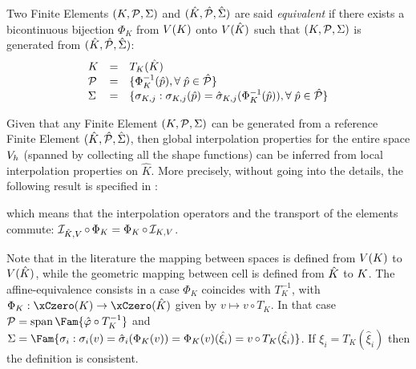 \begin{dfntn}
Two Finite Elements ${({K},{\mathcal P}, {\Sigma})}$ and ${({\hat {{K}}},{\hat {{\mathcal P}}}, {\hat{{\Sigma}}})}$ are said \textit{equivalent} if there exists a bicontinuous bijection $\Phi_K$ from ${V}({K})$ onto ${V}({\hat {{K}}})$ such that ${({K},{\mathcal P}, {\Sigma})}$ is generated from ${({\hat {{K}}},{\hat {{\mathcal P}}}, {\hat{{\Sigma}}})}$:
\begin{equation*}
\begin{array}{lcl}
K       &=& T_K(\hat K)\\
{\mathcal P} &=& \lbrace \Phi_K^{-1}(\hat p), {\forall\;} \hat p \in {\hat {{\mathcal P}}} \rbrace\\
\Sigma  &=& \lbrace \sigma_{K,j} : \sigma_{K,j}(\hat p) = \hat\sigma_{K,j}(\Phi_K^{-1}(\hat p)), {\forall\;} \hat p \in {\hat {{\mathcal P}}} \rbrace
\end{array}
\end{equation*}
\end{dfntn}

Given that any Finite Element ${({K},{\mathcal P}, {\Sigma})}$ can be generated from a reference Finite Element ${({\hat {{K}}},{\hat {{\mathcal P}}}, {\hat{{\Sigma}}})}$, then global interpolation properties for the entire space ${{V}}_h$ (spanned by collecting all the shape functions) can be inferred from local interpolation properties on $\hat K$. More precisely, without going into the details, the following result is specified in \cite{EG}:
\begin{center}
\end{center}
which means that the interpolation operators and the transport of the elements commute: $\mathop{\mathcal{I}_{{\hat {{K}}},{V}}}\mathop{\circ}\Phi_K = \Phi_K\mathop{\circ} \mathop{\mathcal{I}_{K,{V}}}$.

\begin{rmrk}
Note that in the literature the mapping between spaces is defined from ${V}({K})$ to ${V}({\hat {{K}}})$, while the geometric mapping between cell is defined from ${\hat {{K}}}$ to ${K}$. The affine-equivalence consists in a case $\Phi_K$ coincides with $T_K^{-1}$, with $\Phi_K: \xCzero(K) \rightarrow \xCzero(\hat K)$ given by $v \mapsto v\mathop{\circ}T_K$. In that case $\SpaceP = \Span\Fam{ \hat\varphi\circ T_K^{-1} }$ and $\Sigma = \Fam{\sigma_i : \sigma_i(v) = \hat\sigma_i(\Phi_K(v)) = \Phi_K(v)(\hat\xi_i) = v\mathop{\circ} T_K(\hat\xi_i)}$.
If $\xi_i = T_K(\hat\xi_i)$ then the definition is consistent.
\end{rmrk}



